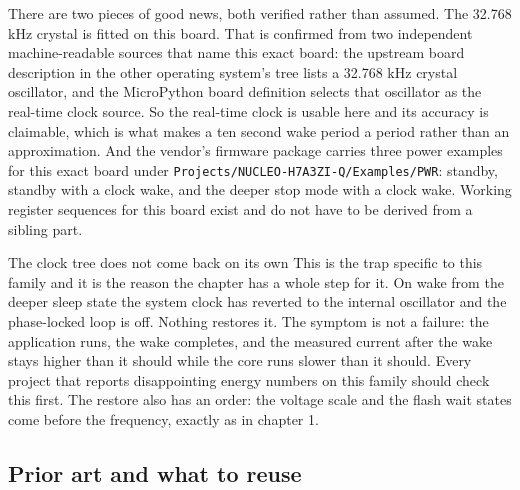 There are two pieces of good news, both verified rather than assumed. The
32.768 kHz crystal is fitted on this board. That is confirmed from two
independent machine-readable sources that name this exact board: the upstream
board description in the other operating system's tree lists a 32.768 kHz
crystal oscillator, and the MicroPython board definition selects that oscillator
as the real-time clock source. So the real-time clock is usable here and its
accuracy is claimable, which is what makes a ten second wake period a period
rather than an approximation. And the vendor's firmware package carries three
power examples for this exact board under
\texttt{Projects/}\allowbreak\texttt{NUCLEO-H7A3ZI-Q/}\allowbreak\texttt{Examples/PWR}: standby, standby with a clock
wake, and the deeper stop mode with a clock wake. Working register sequences
for this board exist and do not have to be derived from a sibling part.

\begin{note}{The clock tree does not come back on its own}
This is the trap specific to this family and it is the reason the chapter has a
whole step for it. On wake from the deeper sleep state the system clock has
reverted to the internal oscillator and the phase-locked loop is off. Nothing
restores it. The symptom is not a failure: the application runs, the wake
completes, and the measured current after the wake stays higher than it should
while the core runs slower than it should. Every project that reports
disappointing energy numbers on this family should check this first. The
restore also has an order: the voltage scale and the flash wait states come
before the frequency, exactly as in chapter 1.
\end{note}

\subsection*{Prior art and what to reuse}

